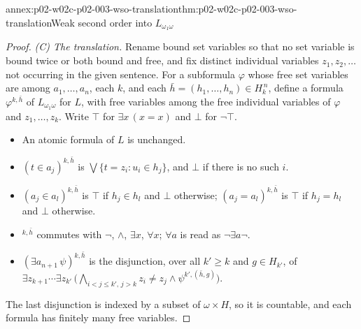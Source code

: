 \begin{annexitem}{annex:p02-w02c-p02-003-wso-translation}{thm:p02-w02c-p02-003-wso-translation}{Weak second order into \(L_{\omega_1\omega}\)}
\begin{proof}
\emph{(C) The translation.}  Rename bound set variables so that no set
variable is bound twice or both bound and free, and fix distinct
individual variables \(z_1,z_2,\ldots\) not occurring in the given
sentence.  For a subformula
\(\varphi\) whose free set variables are among \(a_1,\ldots,a_n\), each
\(k\), and each \(\bar h=(h_1,\ldots,h_n)\in H_k^{\,n}\), define a formula
\(\varphi^{k,\bar h}\) of \(L_{\omega_1\omega}\) for \(L\), with free
variables among the free individual variables of \(\varphi\) and
\(z_1,\ldots,z_k\).  Write \(\top\) for \(\exists x\,(x=x)\) and \(\bot\)
for \(\neg\top\).
\begin{itemize}
\item An atomic formula of \(L\) is unchanged.
\item \((t\in a_j)^{k,\bar h}\) is \(\bigvee\{t=z_i:u_i\in h_j\}\), and
      \(\bot\) if there is no such \(i\).
\item \((a_j\in a_l)^{k,\bar h}\) is \(\top\) if \(h_j\in h_l\) and \(\bot\)
      otherwise; \((a_j=a_l)^{k,\bar h}\) is \(\top\) if \(h_j=h_l\) and
      \(\bot\) otherwise.
\item \({}^{k,\bar h}\) commutes with \(\neg\), \(\land\), \(\exists x\),
      \(\forall x\); \(\forall a\) is read as \(\neg\exists a\neg\).
\item \((\exists a_{n+1}\,\psi)^{k,\bar h}\) is the disjunction, over all
      \(k'\geq k\) and \(g\in H_{k'}\), of
      \(\exists z_{k+1}\cdots\exists z_{k'}\,
      \bigl(\bigwedge_{i<j\leq k',\,j>k}z_i\neq z_j\land
      \psi^{k',(\bar h,g)}\bigr)\).
\end{itemize}
The last disjunction is indexed by a subset of \(\omega\times H\), so it is
countable, and each formula has finitely many free variables.


\end{proof}
\end{annexitem}
